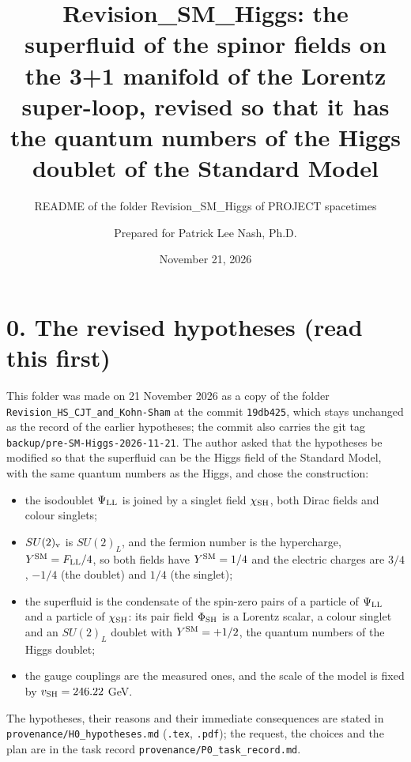 \documentclass[
  10pt,
]{article}
\title{Revision\_SM\_Higgs: the superfluid of the spinor fields on the
3+1 manifold of the Lorentz super-loop, revised so that it has the
quantum numbers of the Higgs doublet of the Standard Model}
\subtitle{README of the folder Revision\_SM\_Higgs of PROJECT
spacetimes}
\author{Prepared for Patrick Lee Nash, Ph.D.}
\date{November 21, 2026}
\providecommand{\tightlist}{%
  \setlength{\itemsep}{0pt}\setlength{\parskip}{0pt}}
\begin{document}
\maketitle

\hypertarget{the-revised-hypotheses-read-this-first}{%
\section{0. The revised hypotheses (read this
first)}\label{the-revised-hypotheses-read-this-first}}

This folder was made on 21 November 2026 as a copy of the folder
\texttt{Revision\_HS\_CJT\_and\_Kohn-Sham} at the commit
\texttt{19db425}, which stays unchanged as the record of the earlier
hypotheses; the commit also carries the git tag
\texttt{backup/pre-SM-Higgs-2026-11-21}. The author asked that the
hypotheses be modified so that the superfluid can be the Higgs field of
the Standard Model, with the same quantum numbers as the Higgs, and
chose the construction:

\begin{itemize}
\tightlist
\item
  the isodoublet \(\Psi_{\rm LL}\) is joined by a singlet field
  \(\chi_{\rm SH}\), both Dirac fields and colour singlets;
\item
  \(SU(2)_{\rm v}\) is \(SU(2)_L\), and the fermion number is the
  hypercharge, \(Y^{\rm SM}=F_{\rm LL}/4\), so both fields have
  \(Y^{\rm SM}=1/4\) and the electric charges are \(3/4\), \(-1/4\) (the
  doublet) and \(1/4\) (the singlet);
\item
  the superfluid is the condensate of the spin-zero pairs of a particle
  of \(\Psi_{\rm LL}\) and a particle of \(\chi_{\rm SH}\): its pair
  field \(\Phi_{\rm SH}\) is a Lorentz scalar, a colour singlet and an
  \(SU(2)_L\) doublet with \(Y^{\rm SM}=+1/2\), the quantum numbers of
  the Higgs doublet;
\item
  the gauge couplings are the measured ones, and the scale of the model
  is fixed by \(v_{\rm SH}=246.22\) GeV.
\end{itemize}

The hypotheses, their reasons and their immediate consequences are
stated in \texttt{provenance/H0\_hypotheses.md} (\texttt{.tex},
\texttt{.pdf}); the request, the choices and the plan are in the task
record \texttt{provenance/P0\_task\_record.md}.
\end{document}
